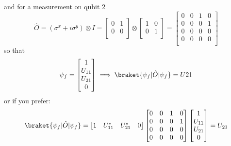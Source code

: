 and for a measurement on qubit 2
\begin{equation}
    \hat{O}=(\sigma^{x} + i\sigma^{y}) \otimes I=
    \begin{bmatrix}
        0 & 1\\
        0 & 0\\
    \end{bmatrix}
    \otimes
    \begin{bmatrix}
        1 & 0\\
        0 & 1\\
    \end{bmatrix}
    =
    \begin{bmatrix}
        0 & 0 & 1 & 0\\
        0 & 0 & 0 & 1\\
        0 & 0 & 0 & 0\\
        0 & 0 & 0 & 0\\
    \end{bmatrix}
\end{equation}
so that
\begin{equation}
    \psi_{f}=
    \begin{bmatrix}
        1 \\
        U_{11} \\
        U_{21} \\
        0 \\
    \end{bmatrix}
    \implies
    \braket{\psi_{f}|\hat{O}|\psi_{f}} = U21
\end{equation}
or if you prefer:
\begin{equation}
    \braket{\psi_{f}|\hat{O}|\psi_{f}} =
    \begin{bmatrix}
        1 & U_{11}^{*} & U_{21}^{*} & 0
    \end{bmatrix}
    \begin{bmatrix}
        0 & 0 & 1 & 0\\
        0 & 0 & 0 & 1\\
        0 & 0 & 0 & 0\\
        0 & 0 & 0 & 0\\
    \end{bmatrix}
    \begin{bmatrix}
        1 \\
        U_{11} \\
        U_{21} \\
        0 \\
    \end{bmatrix}
    = U_{21}
\end{equation}



